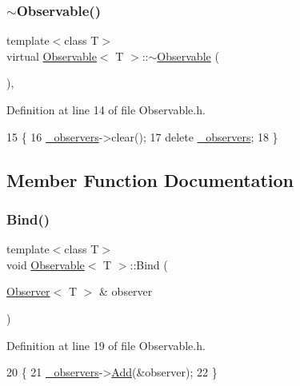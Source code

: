 \subsubsection{\texorpdfstring{$\sim$\+Observable()}{~Observable()}}
{\footnotesize\ttfamily template$<$class T$>$ \\
virtual \mbox{\hyperlink{classObservable}{Observable}}$<$ T $>$\+::$\sim$\mbox{\hyperlink{classObservable}{Observable}} (\begin{DoxyParamCaption}{ }\end{DoxyParamCaption})\hspace{0.3cm}{\ttfamily [inline]}, {\ttfamily [virtual]}}



Definition at line 14 of file Observable.\+h.


\begin{DoxyCode}
15     \{
16         \mbox{\hyperlink{classObservable_ae6028589035c86e8a9c4375306dca702}{\_observers}}->clear();
17         \textcolor{keyword}{delete} \mbox{\hyperlink{classObservable_ae6028589035c86e8a9c4375306dca702}{\_observers}};
18     \}
\end{DoxyCode}


\subsection{Member Function Documentation}
\mbox{\label{classObservable_aedd54eccbfad67066226ee0b958347ba}} 
\subsubsection{\texorpdfstring{Bind()}{Bind()}}
{\footnotesize\ttfamily template$<$class T$>$ \\
void \mbox{\hyperlink{classObservable}{Observable}}$<$ T $>$\+::Bind (\begin{DoxyParamCaption}\item[{\mbox{\hyperlink{classObserver}{Observer}}$<$ T $>$ \&}]{observer }\end{DoxyParamCaption})\hspace{0.3cm}{\ttfamily [inline]}}



Definition at line 19 of file Observable.\+h.


\begin{DoxyCode}
20     \{
21         \mbox{\hyperlink{classObservable_ae6028589035c86e8a9c4375306dca702}{\_observers}}->\mbox{\hyperlink{classGeneric_1_1Collection_a602c700fa46602ce551b5c133793924c}{Add}}(&observer);
22     \}
\end{DoxyCode}
\mbox{\label{classObservable_afaa016d6c6b8a6fad20bb388d35ca014}} 
